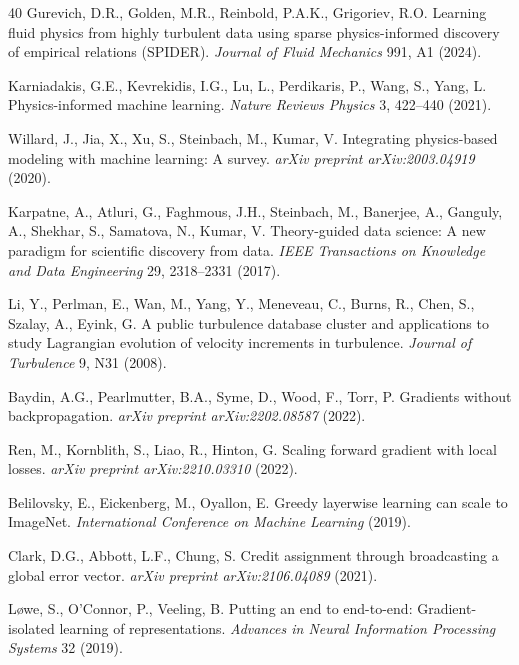 \documentclass[preprint,12pt]{elsarticle}
\begin{document}
\begin{thebibliography}{40}
Gurevich, D.R., Golden, M.R., Reinbold, P.A.K., Grigoriev, R.O. 
Learning fluid physics from highly turbulent data using sparse physics-informed discovery of empirical relations (SPIDER). 
\textit{Journal of Fluid Mechanics} 991, A1 (2024).

Karniadakis, G.E., Kevrekidis, I.G., Lu, L., Perdikaris, P., Wang, S., Yang, L. 
Physics-informed machine learning. 
\textit{Nature Reviews Physics} 3, 422--440 (2021).

Willard, J., Jia, X., Xu, S., Steinbach, M., Kumar, V. 
Integrating physics-based modeling with machine learning: A survey. 
\textit{arXiv preprint arXiv:2003.04919} (2020).

Karpatne, A., Atluri, G., Faghmous, J.H., Steinbach, M., Banerjee, A., Ganguly, A., Shekhar, S., Samatova, N., Kumar, V. 
Theory-guided data science: A new paradigm for scientific discovery from data. 
\textit{IEEE Transactions on Knowledge and Data Engineering} 29, 2318--2331 (2017).

Li, Y., Perlman, E., Wan, M., Yang, Y., Meneveau, C., Burns, R., Chen, S., Szalay, A., Eyink, G. 
A public turbulence database cluster and applications to study Lagrangian evolution of velocity increments in turbulence. 
\textit{Journal of Turbulence} 9, N31 (2008).

Baydin, A.G., Pearlmutter, B.A., Syme, D., Wood, F., Torr, P. 
Gradients without backpropagation. 
\textit{arXiv preprint arXiv:2202.08587} (2022).

Ren, M., Kornblith, S., Liao, R., Hinton, G. 
Scaling forward gradient with local losses. 
\textit{arXiv preprint arXiv:2210.03310} (2022).

Belilovsky, E., Eickenberg, M., Oyallon, E. 
Greedy layerwise learning can scale to ImageNet. 
\textit{International Conference on Machine Learning} (2019).

Clark, D.G., Abbott, L.F., Chung, S. 
Credit assignment through broadcasting a global error vector. 
\textit{arXiv preprint arXiv:2106.04089} (2021).

L{\o}we, S., O'Connor, P., Veeling, B. 
Putting an end to end-to-end: Gradient-isolated learning of representations. 
\textit{Advances in Neural Information Processing Systems} 32 (2019).


\end{thebibliography}
\end{document}

